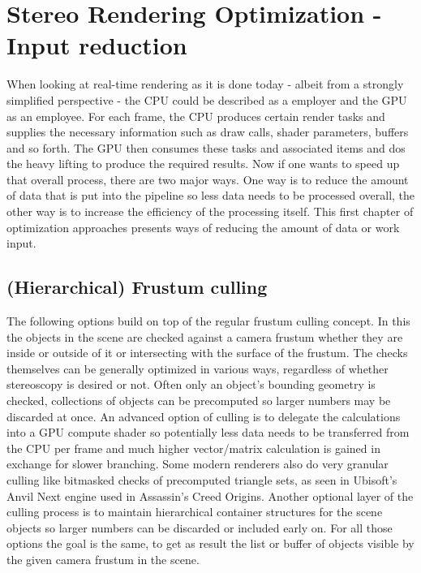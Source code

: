 
\chapter{Stereo Rendering Optimization - Input reduction}
When looking at real-time rendering as it is done today - albeit from a strongly simplified perspective - the CPU could be described as a employer and the GPU as an employee. For each frame, the CPU produces certain render tasks and supplies the necessary information such as draw calls, shader parameters, buffers and so forth. The GPU then consumes these tasks and associated items and dos the heavy lifting to produce the required results. 
Now if one wants to speed up that overall process, there are two major ways. One way is to reduce the amount of data that is put into the pipeline so less data needs to be processed overall, the other way is to increase the efficiency of the processing itself.  
This first chapter of optimization approaches presents ways of reducing the amount of data or work input. 

\section{(Hierarchical) Frustum culling}
The following options build on top of the regular frustum culling concept. In this the objects in the scene are checked against a camera frustum whether they are inside or outside of it or intersecting with the surface of the frustum. The checks themselves can be generally optimized in various ways, regardless of whether stereoscopy is desired or not. Often only an object's bounding geometry is checked, collections of objects can be precomputed so larger numbers may be discarded at once. An advanced option of culling is to delegate the calculations into a GPU compute shader so potentially less data needs to be transferred from the CPU per frame and much higher vector/matrix calculation is gained in exchange for slower branching. Some modern renderers also do very granular culling like bitmasked checks of precomputed triangle sets, as seen in Ubisoft's Anvil Next engine used in Assassin's Creed Origins\cite{Haar.2015}. 
Another optional layer of the culling process is to maintain hierarchical container structures for the scene objects so larger numbers can be discarded or included early on. 
For all those options the goal is the same, to get as result the list or buffer of objects visible by the given camera frustum in the scene. 


